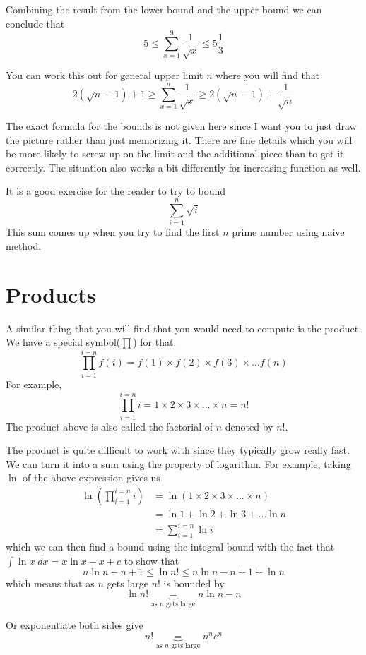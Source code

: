 \documentclass[a4paper, 12pt]{article}
\begin{document}
\begin{multicols}{2}
Combining the result from the lower bound and the upper bound we can conclude that
\[
 5 \le \sum_{x=1}^{9} \frac{1}{\sqrt{x}} \le 5\frac{1}{3}
\]

You can work this out for general upper limit $n$ where you will find that
\[
	2 \left( \sqrt{n} - 1 \right )+ 1 \ge \sum_{x=1}^{n} \frac{1}{\sqrt{x}} \ge 2 \left( \sqrt{n} -1  \right )+ \frac{1}{\sqrt{n}}
\]

The exact formula for the bounds is not given here since I want you to just draw the picture rather than just memorizing it. There are fine details which you will be more likely to screw up on the limit and the additional piece than to get it correctly. The situation also works a bit differently for increasing function as well.

It is a good exercise for the reader to try to bound
\[
	\sum_{i=1}^{n} \sqrt{i} 
\]
This sum comes up when you try to find the first $n$ prime number using naive method.

\section*{Products}
A similar thing that you will find that you would need to compute is the product. We have a special symbol($\prod$) for that.
\[
	\prod_{i=1}^{i=n} f(i) = f(1)\times f(2)\times f(3)\times \ldots f(n)
\]
For example,
\[
\prod_{i=1}^{i=n} i = 1 \times  2 \times 3 \times \ldots \times n = n!
\]
The product above is also called the factorial of $n$ denoted by $n!$.

The product is quite difficult to work with since they typically grow really fast. We can turn it into a sum using the property of logarithm. For example, taking $\ln$ of the above expression gives us
\begin{align*}
	\ln(\prod_{i=1}^{i=n} i) &= \ln(1 \times  2 \times 3 \times \ldots \times n)\\
	&= \ln 1 + \ln 2 + \ln 3 + \ldots \ln n\\
	&= \sum_{i=1}^{i=n} \ln i
\end{align*}
which we can then find a bound using the integral bound with the fact that $\int \ln x\; dx = x\ln x -x +c $ to show that
\[
	n\ln n -n +1 \le \ln n!  \le n \ln n  -n + 1 + \ln n
\]
which means that as $n$ gets large $n!$ is bounded by
\[
	\ln n! \underbrace{=}_{\text{as $n$ gets large}} n\ln n - n
\]

Or exponentiate both sides give
\[
	n! \underbrace{=}_{\text{as $n$ gets large}} n^n e^n
\]



\end{multicols}
\end{document}
